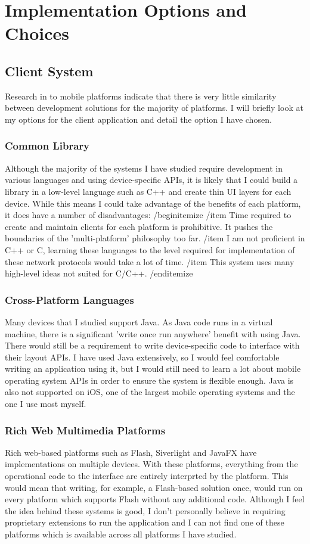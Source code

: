 \documentclass[a4papert,11pt,notitlepage]{ltxdoc}
\begin{document}
\section{Implementation Options and Choices}
\subsection{Client System}
Research in to mobile platforms indicate that there is very little similarity between development solutions for the majority of platforms. I will briefly look at my options for the client application and detail the option I have chosen.

\subsubsection{Common Library}
Although the majority of the systems I have studied require development in various languages and using device-specific APIs, it is likely that I could build a library in a low-level language such as C++ and create thin UI layers for each device. While this means I could take advantage of the benefits of each platform, it does have a number of disadvantages:
/begin{itemize}
/item Time required to create and maintain clients for each platform is prohibitive. It pushes the boundaries of the 'multi-platform' philosophy too far.
/item I am not proficient in C++ or C, learning these languages to the level required for implementation of these network protocols would take a lot of time.
/item This system uses many high-level ideas not suited for C/C++.
/end{itemize}

\subsubsection{Cross-Platform Languages}
Many devices that I studied support Java. As Java code runs in a virtual machine, there is a significant 'write once run anywhere' benefit with using Java. There would still be a requirement to write device-specific code to interface with their layout APIs. I have used Java extensively, so I would feel comfortable writing an application using it, but I would still need to learn a lot about mobile operating system APIs in order to ensure the system is flexible enough. Java is also not supported on iOS, one of the largest mobile operating systems and the one I use most myself.

\subsubsection{Rich Web Multimedia Platforms}
Rich web-based platforms such as Flash, Siverlight and JavaFX have implementations on multiple devices. With these platforms, everything from the operational code to the interface are entirely interprted by the platform. This would mean that writing, for example, a Flash-based solution once, would run on every platform which supports Flash without any additional code. Although I feel the idea behind these systems is good, I don't personally believe in requiring proprietary extensions to run the application and I can not find one of these platforms which is available across all platforms I have studied.
\end{document}
